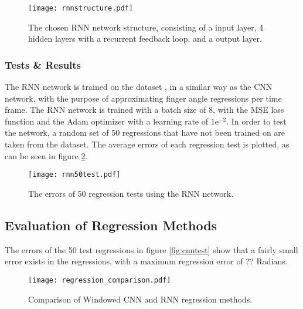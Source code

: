 \documentclass[../main.tex]{subfiles}
\begin{document}
\begin{figure}[H]
\begin{center}
\texttt{[image: rnnstructure.pdf]}
\caption{The chosen RNN network structure, consisting of a input layer, 4 hidden layers with a recurrent feedback loop, and a output layer.}
\label{fig:rnn_structure}
\end{center}
\end{figure}

\subsubsection{Tests \& Results}

The RNN network is trained on the dataset \cite{kinmusdataset}, in a similar way as the CNN network, with the purpose of approximating finger angle regressions per time frame.
The RNN network is trained with a batch size of 8, with the  MSE loss function and the Adam optimizer with a learning rate of $1\text{e}^{-2}$.
In order to test the network, a random set of 50 regressions that have not been trained on are taken from the dataset.
The average errors of each regression test is plotted, as can be seen in figure \ref{fig:rnntest}.

\begin{figure}[H]
\begin{center}
\texttt{[image: rnn50test.pdf]}
\caption{The errors of 50 regression tests using the RNN network.}
\label{fig:rnntest}
\end{center}
\end{figure}

\subsection{Evaluation of Regression Methods}

The errors of the 50 test regressions in figure \ref{fig:cnntest} show that a fairly small error exists in the regressions, with a maximum regression error of ?? Radians.

\begin{figure}[h]
\begin{center}
\texttt{[image: regression\_comparison.pdf]}
\caption{Comparison of Windowed CNN and RNN regression methods.}
\label{fig:regression_comp}
\end{center}
\end{figure}
\end{document}
